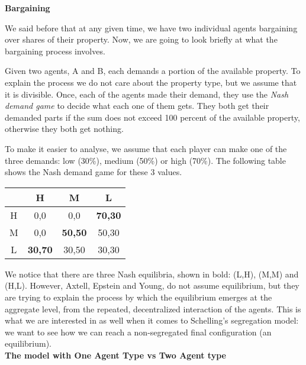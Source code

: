 \documentclass[../main.tex]{subfiles}
\begin{document}
\textbf{Bargaining}

We said before that at any given time, we have two individual agents bargaining over shares of their property. Now, we are going to look briefly at what the bargaining process involves. 

Given two agents, A and B, each demands a portion of the available property. To explain the process we do not care about the property type, but we assume that it is divisible. Once, each of the agents made their demand, they use the \textit{Nash demand game} to decide what each one of them gets. They both get their demanded parts if the sum does not exceed 100 percent of the available property, otherwise they both get nothing. 

To make it easier to analyse, we assume that each player can make one of the three demands: low (30\%), medium (50\%) or high (70\%). The following table shows the Nash demand game for these 3 values.

\begin{table}[H]
\begin{center}
{\begin{tabular}{ c c c c}
\hline
& H & M & L\\
\hline
H & 0,0 & 0,0 & \textbf{70,30}\\
M & 0,0 & \textbf{50,50} & 50,30 \\
L & \textbf{30,70} & 30,50 &30,30\\
 \hline
\end{tabular}}
\end{center}
\end{table}

We notice that there are three Nash equilibria, shown in bold: (L,H), (M,M) and (H,L). However, Axtell, Epstein and Young, do not assume equilibrium, but they are trying to explain the process by which the equilibrium emerges at the aggregate level, from the repeated, decentralized interaction of the agents. This is what we are interested in as well when it comes to Schelling's segregation model: we want to see how we can reach a non-segregated final configuration (an equilibrium).\\

\textbf{The model with One Agent Type vs Two Agent type}
\end{document}
